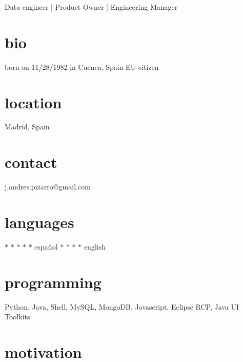 \documentclass[]{friggeri-cv}
\begin{document}
       {Data engineer | Product Owner | Engineering Manager}



\begin{aside} %
  \section{bio}
  born on 11/28/1982
  in Cuenca, Spain
  EU-citizen
  \section{location}
  Madrid, Spain
  \section{contact}
  j.andres.pizarro@gmail.com
  \section{languages}
  {\color{lightgray} $\ast$}{\color{lightgray} $\ast$}{\color{lightgray} $\ast$}{\color{lightgray} $\ast$}{\color{lightgray} $\ast$} español
  {\color{lightgray} $\ast$}{\color{lightgray} $\ast$}{\color{lightgray} $\ast$}{\color{lightgray} $\ast$} english
  \section{programming}
  Python, Java, Shell,
  MySQL, MongoDB, Javascript,
  Eclipse RCP, Java UI Toolkits
\end{aside}


\section{motivation}
\end{document}
